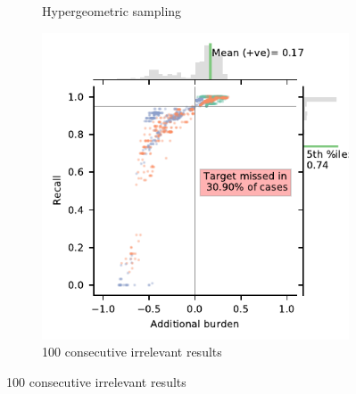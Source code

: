 \documentclass{bmcart}
\begin{document}
\begin{figure}
\begin{subfigure}[b]{0.475\textwidth}
		\caption[]%
		{{\small Hypergeometric sampling \\}}    
		\label{fig:hyper_ab}
	\end{subfigure}
	\hfill
	\begin{subfigure}[b]{0.475\textwidth}   
		\centering 
		\includegraphics[width=\textwidth]{../images/jointplot_burden_ih_100}
		\caption[]%
		{{\small 100 consecutive irrelevant results }}    
		\label{fig:ih_200_ab}		


\end{subfigure}
\end{figure}
\end{document}
